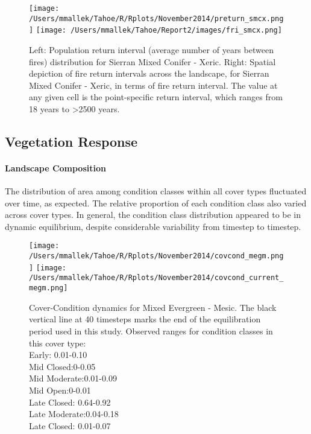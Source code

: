 \begin{figure}[p]
\texttt{[image: /Users/mmallek/Tahoe/R/Rplots/November2014/preturn\_smcx.png]}
\texttt{[image: /Users/mmallek/Tahoe/Report2/images/fri\_smcx.png]}
\caption{Left: Population return interval (average number of years between fires) distribution for Sierran Mixed Conifer - Xeric.  Right: Spatial depiction of fire return intervals across the landscape, for Sierran Mixed Conifer - Xeric, in terms of fire return interval. The value at any given cell is the point-specific return interval, which ranges from 18 years to \textgreater 2500 years.}
\label{preturn_smcx}
\end{figure}

\subsection{Vegetation Response}
\label{subsec:HRVvegresponse}

\paragraph{Landscape Composition}

The distribution of area among condition classes within all cover types fluctuated over time, as expected. The relative proportion of each condition class also varied across cover types. In general, the condition class distribution appeared to be in dynamic equilibrium, despite considerable variability from timestep to timestep. 

\begin{figure}
\texttt{[image: /Users/mmallek/Tahoe/R/Rplots/November2014/covcond\_megm.png]}
\texttt{[image: /Users/mmallek/Tahoe/R/Rplots/November2014/covcond\_current\_megm.png]}
\caption{Cover-Condition dynamics for Mixed Evergreen - Mesic. The black vertical line at 40 timesteps marks the end of the equilibration period used in this study. Observed ranges for condition classes in this cover type: \\
Early: 0.01-0.10 \\
Mid Closed:0-0.05 \\
Mid Moderate:0.01-0.09\\
Mid Open:0-0.01 \\
Late Closed: 0.64-0.92 \\
Late Moderate:0.04-0.18 \\
Late Closed: 0.01-0.07}
\label{covcond_megm}
\end{figure}

